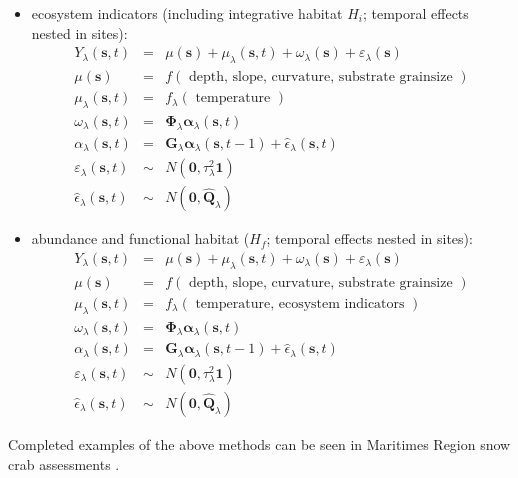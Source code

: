 \documentclass[letterpaper,portrait,11pt]{scrartcl}
\numberwithin{equation}{section}    %
\numberwithin{figure}{section}    %
\numberwithin{table}{section}       %
\begin{document}
\begin{itemize}
\item ecosystem indicators (including integrative habitat $H_i$; temporal effects nested in sites):
  \begin{eqnarray*}
  Y_\lambda(\bm{s},t) &=& \mu(\bm{s}) + \mu_\lambda(\bm{s},t) + \omega_\lambda(\bm{s}) + \varepsilon_\lambda(\bm{s}) \\
  \mu(\bm{s}) &=& f ( \text{ depth, slope, curvature, substrate grainsize } ) \\
  \mu_\lambda(\bm{s},t) &=& f_\lambda ( \text{ temperature } ) \\
  \omega_\lambda(\bm{s},t) &=& \bm{\Phi}_\lambda \bm{\alpha}_\lambda (\bm{s},t)  \\
  \alpha_\lambda(\bm{s},t) &=& \bm{G}_\lambda \bm{\alpha}_\lambda (\bm{s},t-1) + \hat{\epsilon}_\lambda(\bm{s},t)  \\
  \varepsilon_\lambda(\bm{s},t) &\sim& N(\bm{0}, \tau_\lambda^2 \bm{1} )  \\
  \hat{\epsilon}_\lambda(\bm{s},t) &\sim& N(\bm{0}, \bm{\hat{Q}}_\lambda)
\end{eqnarray*}

\item abundance and functional habitat ($H_f$; temporal effects nested in sites):
  \begin{eqnarray*}
  Y_\lambda(\bm{s},t) &=& \mu(\bm{s}) + \mu_\lambda(\bm{s},t) + \omega_\lambda(\bm{s}) + \varepsilon_\lambda(\bm{s}) \\
  \mu(\bm{s}) &=& f ( \text{ depth, slope, curvature, substrate grainsize } ) \\
  \mu_\lambda(\bm{s},t) &=& f_\lambda ( \text{ temperature, ecosystem indicators } ) \\
  \omega_\lambda(\bm{s},t) &=& \bm{\Phi}_\lambda \bm{\alpha}_\lambda (\bm{s},t)  \\
  \alpha_\lambda (\bm{s},t) &=& \bm{G}_\lambda \bm{\alpha}_\lambda (\bm{s},t-1) + \hat{\epsilon}_\lambda(\bm{s},t)  \\
  \varepsilon_\lambda(\bm{s},t) &\sim& N(\bm{0}, \tau_\lambda^2 \bm{1} )  \\
  \hat{\epsilon}_\lambda(\bm{s},t) &\sim& N(\bm{0}, \bm{\hat{Q}}_\lambda)
\end{eqnarray*}

\end{itemize}

Completed examples of the above methods can be seen in Maritimes Region snow crab assessments \parencite{ref:snowcrabAssessment2016}.
\end{document}

